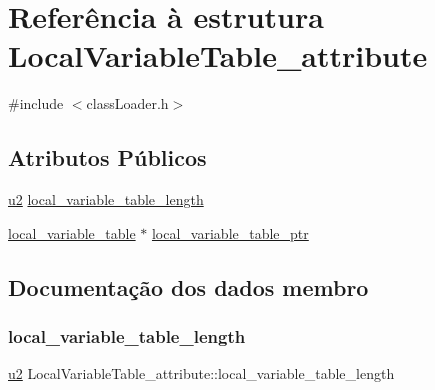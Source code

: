 \hypertarget{struct_local_variable_table__attribute}{}\section{Referência à estrutura Local\+Variable\+Table\+\_\+attribute}
\label{struct_local_variable_table__attribute}


{\ttfamily \#include $<$class\+Loader.\+h$>$}

\subsection*{Atributos Públicos}
\begin{DoxyCompactItemize}
\item 
\hyperlink{util_8h_a55ef8d87fd202b8417704c089899c5b9}{u2} \hyperlink{struct_local_variable_table__attribute_a64ee9d68a72f161a074d912bc0b8802f}{local\+\_\+variable\+\_\+table\+\_\+length}
\item 
\hyperlink{structlocal__variable__table}{local\+\_\+variable\+\_\+table} $\ast$ \hyperlink{struct_local_variable_table__attribute_a344c097a0c1792b8a042a8ef05cbfe68}{local\+\_\+variable\+\_\+table\+\_\+ptr}
\end{DoxyCompactItemize}


\subsection{Documentação dos dados membro}
\mbox{\label{struct_local_variable_table__attribute_a64ee9d68a72f161a074d912bc0b8802f}} 
\subsubsection{\texorpdfstring{local\+\_\+variable\+\_\+table\+\_\+length}{local\_variable\_table\_length}}
{\footnotesize\ttfamily \hyperlink{util_8h_a55ef8d87fd202b8417704c089899c5b9}{u2} Local\+Variable\+Table\+\_\+attribute\+::local\+\_\+variable\+\_\+table\+\_\+length}


